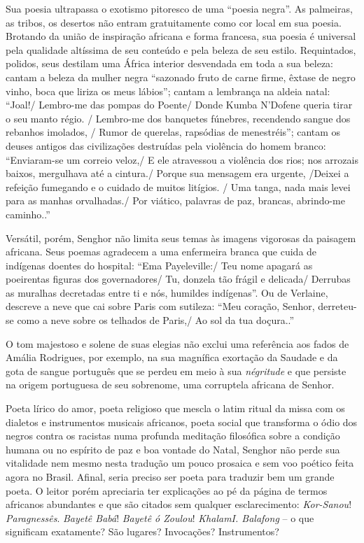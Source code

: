 \documentclass[
  letterpaper,
  DIV=11,
  numbers=noendperiod]{scrreprt}
\begin{document}
Sua poesia ultrapassa o exotismo pitoresco de uma ``poesia negra''. As
palmeiras, as tribos, os desertos não entram gratuitamente como cor
local em sua poesia. Brotando da união de inspiração africana e forma
francesa, sua poesia é universal pela qualidade altíssima de seu
conteúdo e pela beleza de seu estilo. Requintados, polidos, seus
destilam uma África interior desvendada em toda a sua beleza: cantam a
beleza da mulher negra ``sazonado fruto de carne firme, êxtase de negro
vinho, boca que liriza os meus lábios''; cantam a lembrança na aldeia
natal: ``Joal!/ Lembro-me das pompas do Poente/ Donde Kumba N'Dofene
queria tirar o seu manto régio. / Lembro-me dos banquetes fúnebres,
recendendo sangue dos rebanhos imolados, / Rumor de querelas, rapsódias
de menestréis''; cantam os deuses antigos das civilizações destruídas
pela violência do homem branco: ``Enviaram-se um correio veloz,/ E ele
atravessou a violência dos rios; nos arrozais baixos, mergulhava até a
cintura./ Porque sua mensagem era urgente, /Deixei a refeição fumegando
e o cuidado de muitos litígios. / Uma tanga, nada mais levei para as
manhas orvalhadas./ Por viático, palavras de paz, brancas, abrindo-me
caminho..''

Versátil, porém, Senghor não limita seus temas às imagens vigorosas da
paisagem africana. Seus poemas agradecem a uma enfermeira branca que
cuida de indígenas doentes do hospital: ``Ema Payeleville:/ Teu nome
apagará as poeirentas figuras dos governadores/ Tu, donzela tão frágil e
delicada/ Derrubas as muralhas decretadas entre ti e nós, humildes
indígenas''. Ou de Verlaine, descreve a neve que cai sobre Paris com
sutileza: ``Meu coração, Senhor, derreteu-se como a neve sobre os
telhados de Paris,/ Ao sol da tua doçura..''

O tom majestoso e solene de suas elegias não exclui uma referência aos
fados de Amália Rodrigues, por exemplo, na sua magnífica exortação da
Saudade e da gota de sangue português que se perdeu em meio à sua
\emph{négritude} e que persiste na origem portuguesa de seu sobrenome,
uma corruptela africana de Senhor.

Poeta lírico do amor, poeta religioso que mescla o latim ritual da missa
com os dialetos e instrumentos musicais africanos, poeta social que
transforma o ódio dos negros contra os racistas numa profunda meditação
filosófica sobre a condição humana ou no espírito de paz e boa vontade
do Natal, Senghor não perde sua vitalidade nem mesmo nesta tradução um
pouco prosaica e sem voo poético feita agora no Brasil. Afinal, seria
preciso ser poeta para traduzir bem um grande poeta. O leitor porém
apreciaria ter explicações ao pé da página de termos africanos
abundantes e que são citados sem qualquer esclarecimento:
\emph{Kor-Sanou}! \emph{Paragnessês}. \emph{Bayetê Babá}! \emph{Bayetê ó
Zoulou}! \emph{KhalamI. Balafong} -- o que significam exatamente? São
lugares? Invocações? Instrumentos?
\end{document}

